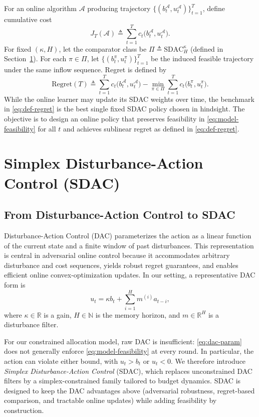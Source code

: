 \documentclass[11pt]{article}
\begin{document}
For an online algorithm $\mathcal{A}$ producing trajectory $\{(b_t^{\mathcal{A}},u_t^{\mathcal{A}})\}_{t=1}^T$, define cumulative cost
\begin{equation}
\label{eq:def-cumulative-cost}
J_T(\mathcal{A}) \triangleq \sum_{t=1}^T c_t\bigl(b_t^{\mathcal{A}},u_t^{\mathcal{A}}\bigr).
\end{equation}
For fixed $(\kappa,H)$, let the comparator class be $\Pi\triangleq\mathrm{SDAC}_H^{\kappa}$ (defined in Section~\ref{sec:sdac}). For each $\pi\in\Pi$, let $\{(b_t^{\pi},u_t^{\pi})\}_{t=1}^T$ be the induced feasible trajectory under the same inflow sequence. Regret is defined by
\begin{equation}
\label{eq:def-regret}
\mathrm{Regret}(T)
\triangleq
\sum_{t=1}^T c_t\bigl(b_t^{\mathcal{A}},u_t^{\mathcal{A}}\bigr)
-
\min_{\pi\in\Pi}
\sum_{t=1}^T c_t\bigl(b_t^{\pi},u_t^{\pi}\bigr).
\end{equation}
While the online learner may update its SDAC weights over time, the benchmark in \eqref{eq:def-regret} is the best single fixed SDAC policy chosen in hindsight.
The objective is to design an online policy that preserves feasibility in \eqref{eq:model-feasibility} for all $t$ and achieves sublinear regret as defined in \eqref{eq:def-regret}.

\section{Simplex Disturbance-Action Control (SDAC)}
\label{sec:sdac}

\subsection{From Disturbance-Action Control to SDAC}
Disturbance-Action Control (DAC) parameterizes the action as a linear function of the current state and a finite window of past disturbances. This representation is central in adversarial online control because it accommodates arbitrary disturbance and cost sequences, yields robust regret guarantees, and enables efficient online convex-optimization updates. In our setting, a representative DAC form is
\begin{equation}
\label{eq:dac-param}
u_t = \kappa b_t + \sum_{i=1}^{H} m^{(i)} a_{t-i},
\end{equation}
where $\kappa\in\mathbb{R}$ is a gain, $H\in\mathbb{N}$ is the memory horizon, and $m\in\mathbb{R}^H$ is a disturbance filter.

For our constrained allocation model, raw DAC is insufficient: \eqref{eq:dac-param} does not generally enforce \eqref{eq:model-feasibility} at every round. In particular, the action can violate either bound, with $u_t>b_t$ or $u_t<0$. We therefore introduce \emph{Simplex Disturbance-Action Control} (SDAC), which replaces unconstrained DAC filters by a simplex-constrained family tailored to budget dynamics. SDAC is designed to keep the DAC advantages above (adversarial robustness, regret-based comparison, and tractable online updates) while adding feasibility by construction.
\end{document}
